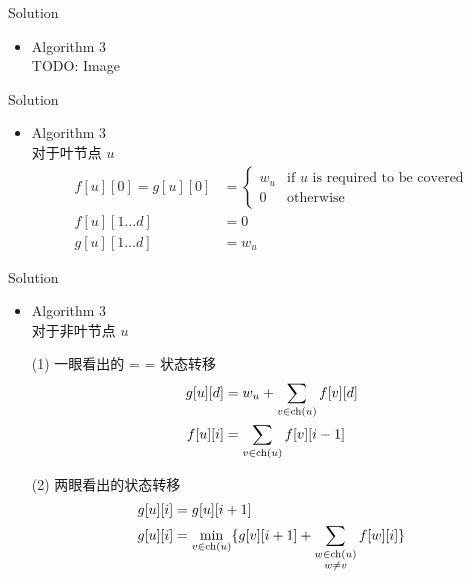 \documentclass[UTF8]{beamer}
\begin{document}
\begin{frame}{Solution}

\begin{itemize}
    \item Algorithm 3 \\
        TODO: Image
\end{itemize}

\end{frame}

\begin{frame}{Solution}

\begin{itemize}
    \item Algorithm 3 \\
        对于叶节点 $u$
        \begin{equation*}\begin{split}
            f[u][0] = g[u][0] &=
            \begin{cases}
                w_u &\mbox{if $u$ is required to be covered} \\
                0   &\mbox{otherwise}
            \end{cases} \\
            f[u][1 \dots d] &= 0 \\
            g[u][1 \dots d] &= w_u
        \end{split}\end{equation*}
\end{itemize}

\end{frame}

\begin{frame}{Solution}

\begin{itemize}
    \item Algorithm 3 \\
        对于非叶节点 $u$

        (1) 一眼看出的 = = 状态转移
        \begin{equation*}\begin{split}
            g[u][d] &= w_u + \sum_{v \in {\rm ch}(u)} f[v][d] \\
            f[u][i] &= \sum_{v \in {\rm ch}(u)} f[v][i - 1]
        \end{split}\end{equation*}

        \pause
        (2) 两眼看出的状态转移
        \begin{equation*}\begin{split}
            g[u][i] &= g[u][i + 1] \\
            g[u][i] &= \min_{v \in {\rm ch}(u)}
                \{g[v][i + 1] + \sum_{\substack{w \in {\rm ch}(u) \\ w \neq v}} f[w][i]\} \\
        \end{split}\end{equation*}
\end{itemize}

\end{frame}
\end{document}
